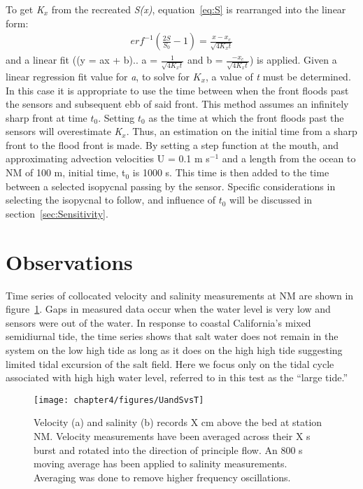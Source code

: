 To get \emph{K$_x$} from the recreated \emph{S(x)}, equation~\ref{eq:S} is rearranged into the linear form:
\begin{eqnarray}
erf^{-1}\left(\frac{2S}{S_0}-1\right) = \frac{x-x_c}{\sqrt{4K_xt}} \label{eq:linfitS}
\end{eqnarray}
and a linear fit ((y = ax + b).. a = $\frac{1}{\sqrt{4K_xt}}$ and b = $\frac{-x_c}{\sqrt{4K_xt}}$) is applied. Given a linear regression fit value for \emph{a}, to solve for $K_x$, a value of \emph{t} must be determined. In this case it is appropriate to use the time between when the front floods past the sensors and subsequent ebb of said front. This method assumes an infinitely sharp front at time $t_0$. Setting $t_0$ as the time at which the front floods past the sensors will overestimate \emph{K$_x$}. Thus, an estimation on the initial time from a sharp front to the flood front is made. By setting a step function at the mouth, and approximating advection velocities U = 0.1 m s$^{-1}$ and a length from the ocean to NM of 100 m, initial time, t$_0$ is 1000 s. This time is then added to the time between a selected isopycnal passing by the sensor. Specific considerations in selecting the isopycnal to follow, and influence of $t_0$ will be discussed in section~\ref{sec:Sensitivity}.



\section{Observations} \label{sec:ObsCh4}
Time series of collocated velocity and salinity measurements at NM are shown in figure~\ref{fig:UandSvsTch4}. Gaps in measured data occur when the water level is very low and sensors were out of the water. In response to coastal California's mixed semidiurnal tide, the time series shows that salt water does not remain in the system on the low high tide  as long as it does on the high high tide suggesting limited tidal excursion of the salt field. Here we focus only on the tidal cycle associated with high high water level, referred to in this test as the \textquotedblleft large tide.''

\begin{figure}[h]
	\texttt{[image: chapter4/figures/UandSvsT]} 
\caption{Velocity (a) and salinity (b) records X cm above the bed at station NM. Velocity measurements have been averaged across their X s burst and rotated into the direction of principle flow. An 800 s moving average has been applied to salinity measurements. Averaging was done to remove higher frequency oscillations.} \label{fig:UandSvsTch4}
\end{figure}

